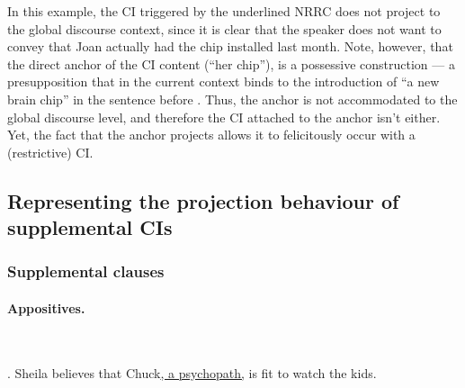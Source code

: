 In this example, the CI triggered by the underlined NRRC does not project to
the global discourse context, since it is clear that the speaker does not
want to convey that Joan actually had the chip installed last month. Note,
however, that the direct anchor of the CI content (``her chip''), is
a possessive construction --- a presupposition that in the current context
binds to the introduction of ``a new brain chip'' in the sentence before
\citep[following][]{sandt1992presupposition}.  Thus, the anchor is not
accommodated to the global discourse level, and therefore the CI attached to
the anchor isn't either. Yet, the fact that the anchor projects allows it to
felicitously occur with a (restrictive) CI.


\subsection{Representing the projection behaviour of supplemental CIs}

\subsubsection{Supplemental clauses}

\paragraph{Appositives.}~

\noindent \parbox[b]{\textwidth}{
\ex. Sheila believes that Chuck\underline{, a psychopath,} is fit to watch
the kids.\\



}


